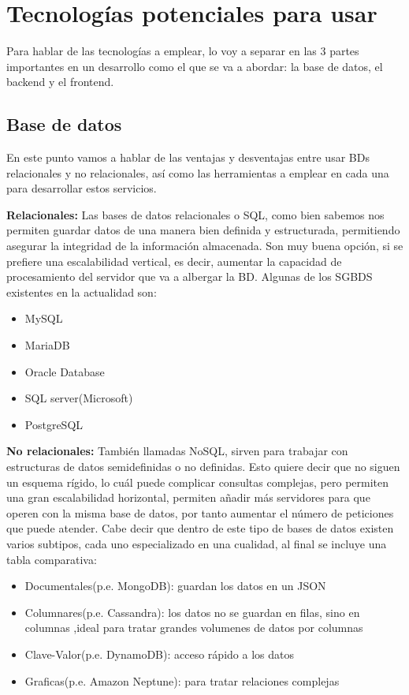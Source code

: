 \section{Tecnologías potenciales para usar}

Para hablar de las tecnologías a emplear, lo voy a separar en las 3 partes importantes en un desarrollo como el que se va a abordar: la base de datos, el backend y el frontend.

\subsection{Base de datos}

En este punto vamos a hablar de las ventajas y desventajas entre usar BDs relacionales y no relacionales, así como las herramientas a emplear en cada una para desarrollar estos servicios.

\textbf{Relacionales:} Las bases de datos relacionales o SQL, como bien sabemos nos permiten guardar datos de una manera bien definida y estructurada, permitiendo asegurar la integridad de la información almacenada. Son muy buena opción, si se prefiere una escalabilidad vertical, es decir, aumentar la capacidad de procesamiento del servidor que va a albergar la BD. Algunas de los SGBDS existentes en la actualidad son:

\begin{itemize}
	\item MySQL
	\item MariaDB
	\item Oracle Database
	\item SQL server(Microsoft)
	\item PostgreSQL
\end{itemize}

\textbf{No relacionales:} También llamadas NoSQL, sirven para trabajar con estructuras de datos semidefinidas o no definidas. Esto quiere decir que no siguen un esquema rígido, lo cuál puede complicar consultas complejas, pero permiten una gran escalabilidad horizontal, permiten añadir más servidores para que operen con la misma base de datos, por tanto aumentar el número de peticiones que puede atender. Cabe decir que dentro de este tipo de bases de datos existen varios subtipos, cada uno especializado en una cualidad, al final se incluye una tabla comparativa:

\begin{itemize}
	\item Documentales(p.e. MongoDB): guardan los datos en un JSON
	\item Columnares(p.e. Cassandra): los datos no se guardan en filas, sino en columnas ,ideal para tratar grandes volumenes de datos por columnas
	\item Clave-Valor(p.e. DynamoDB): acceso rápido a los datos
	\item Graficas(p.e. Amazon Neptune): para tratar relaciones complejas
\end{itemize}

